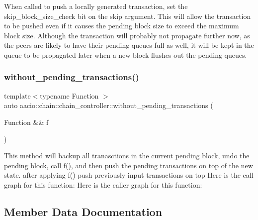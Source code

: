 When called to push a locally generated transaction, set the skip\+\_\+block\+\_\+size\+\_\+check bit on the skip argument. This will allow the transaction to be pushed even if it causes the pending block size to exceed the maximum block size. Although the transaction will probably not propagate further now, as the peers are likely to have their pending queues full as well, it will be kept in the queue to be propagated later when a new block flushes out the pending queues. \mbox{\label{classaacio_1_1chain_1_1chain__controller_a442beb698ea61031638b7cbae7fca7c6}} 
\subsubsection{\texorpdfstring{without\+\_\+pending\+\_\+transactions()}{without\_pending\_transactions()}}
{\footnotesize\ttfamily template$<$typename Function $>$ \\
auto aacio\+::chain\+::chain\+\_\+controller\+::without\+\_\+pending\+\_\+transactions (\begin{DoxyParamCaption}\item[{Function \&\&}]{f }\end{DoxyParamCaption})\hspace{0.3cm}{\ttfamily [inline]}}

This method will backup all tranasctions in the current pending block, undo the pending block, call f(), and then push the pending transactions on top of the new state. after applying f() push previously input transactions on top Here is the call graph for this function\+:
Here is the caller graph for this function\+:


\subsection{Member Data Documentation}
\mbox{\label{classaacio_1_1chain_1_1chain__controller_adc108094f81f4cc535d3927e97be1d4a}} 
